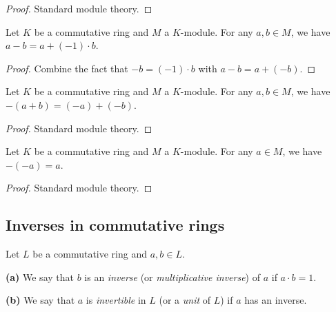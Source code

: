 \begin{proof}
\leanok
Standard module theory.
\end{proof}

\begin{lemma}
\label{lem.module.sub-eq-add-neg-one-smul}
\leanhelper
\leanok
Let $K$ be a commutative ring and $M$ a $K$-module. For any $a,b\in M$,
we have $a - b = a + (-1)\cdot b$.
\end{lemma}

\begin{proof}
\leanok
Combine the fact that $-b = (-1)\cdot b$ with $a - b = a + (-b)$.
\end{proof}

\begin{lemma}
\label{lem.module.neg-add}
\leanhelper
\leanok
Let $K$ be a commutative ring and $M$ a $K$-module. For any $a,b\in M$,
we have $-(a+b) = (-a) + (-b)$.
\end{lemma}

\begin{proof}
\leanok
Standard module theory.
\end{proof}

\begin{lemma}
\label{lem.module.neg-neg}
\leanhelper
\leanok
Let $K$ be a commutative ring and $M$ a $K$-module. For any $a\in M$,
we have $-(-a) = a$.
\end{lemma}

\begin{proof}
\leanok
Standard module theory.
\end{proof}

\subsection{Inverses in commutative rings}

\begin{definition}
\label{def.commring.inverse}
\leanhelper
\leanok
Let $L$ be a commutative ring and $a, b \in L$.

\textbf{(a)} We say that $b$ is an \emph{inverse} (or \emph{multiplicative inverse})
of $a$ if $a \cdot b = 1$.

\textbf{(b)} We say that $a$ is \emph{invertible} in $L$ (or a \emph{unit} of $L$)
if $a$ has an inverse.
\end{definition}

